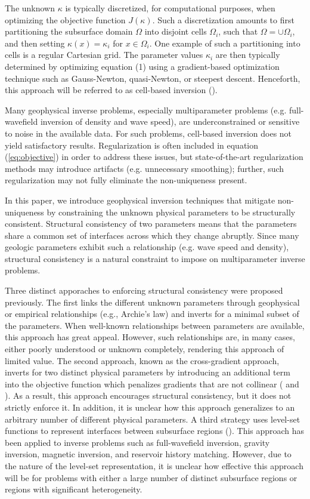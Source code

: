 \documentclass[manuscript,revised]{geophysics}
\begin{document}
The unknown $\kappa$ is typically discretized, for computational purposes, when optimizing the objective function $J\left(\kappa\right)$. Such a discretization amounts to first partitioning the subsurface domain $\Omega$ into disjoint cells $\Omega_i$, such that $\Omega = \cup\Omega_i$, and then setting $\kappa(x)=\kappa_i$ for $x \in \Omega_i$.  One example of such a partitioning into cells is a regular Cartesian grid. The parameter values ${\kappa_i}$ are then typically determined by optimizing equation (1) using a gradient-based optimization technique such as Gauss-Newton, quasi-Newton, or steepest descent. Henceforth, this approach will be referred to as cell-based inversion (\cite{Aster_2013}).

Many geophysical inverse problems, especially multiparameter problems (e.g. full-wavefield inversion of density and wave speed), are underconstrained or sensitive to noise in the available data.  For such problems, cell-based inversion does not yield satisfactory results.  Regularization is often included in equation (\ref{eq:objective}) in order to address these issues, but state-of-the-art regularization methods may introduce artifacts (e.g. unnecessary smoothing); further, such regularization may not fully eliminate the non-uniqueness present.  

In this paper, we introduce geophysical inversion techniques that mitigate non-uniqueness by constraining the unknown physical parameters to be structurally consistent.  Structural consistency of two parameters means that the parameters share a common set of interfaces across which they change abruptly.  Since many geologic parameters exhibit such a relationship (e.g. wave speed and density), structural consistency is a natural constraint to impose on multiparameter inverse problems.  

Three distinct apporaches to enforcing structural consistency were proposed previously.  The first links the different unknown parameters through geophysical or empirical relationships (e.g., Archie’s law) and inverts for a minimal subset of the parameters. When well-known relationships between parameters are available, this approach has great appeal. However, such relationships are, in many cases, either poorly understood or unknown completely, rendering this approach of limited value.  The second approach, known as the cross-gradient approach, inverts for two distinct physical parameters by introducing an additional term into the objective function which penalizes gradients that are not collinear (\cite{Haber_1997} and \cite{Gallardo_2007}). As a result, this approach encourages structural consistency, but it does not strictly enforce it. In addition, it is unclear how this approach generalizes to an arbitrary number of different physical parameters. 
A third strategy uses level-set functions to represent interfaces between subsurface regions (\cite{Kadu_2016}). This approach has been applied to inverse problems such as full-wavefield inversion, gravity inversion, magnetic inversion, and reservoir history matching. However, due to the nature of the level-set representation, it is unclear how effective this approach will be for problems with either a large number of distinct subsurface regions or regions with significant heterogeneity. 
\end{document}

